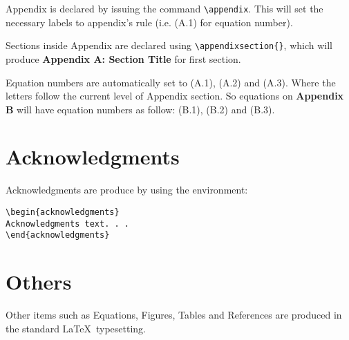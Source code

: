 \documentclass{clv3}
\begin{document}
Appendix is declared by issuing the command \verb|\appendix|. This will set
the necessary labels to appendix's rule (i.e. (A.1) for equation number).

Sections inside Appendix are declared using \verb|\appendixsection{}|, which
will produce {\bf Appendix A: Section Title} for first section.

Equation numbers are automatically set to (A.1), (A.2) and (A.3). Where the letters
follow the current level of Appendix section. So equations on {\bf Appendix B}
will have equation numbers as follow: (B.1), (B.2) and (B.3).

\section{Acknowledgments}

Acknowledgments are produce by using the environment:
\\
\begin{verbatim}
\begin{acknowledgments}
Acknowledgments text. . .
\end{acknowledgments}
\end{verbatim}

\section{Others}

Other items such as Equations, Figures, Tables and References are produced in
the standard \LaTeX\ typesetting.

\starttwocolumn

\end{document}

